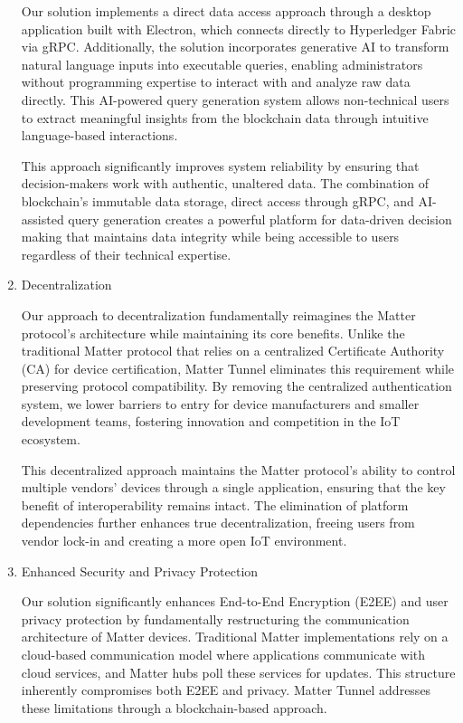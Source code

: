 \documentclass[conference]{IEEEtran}
\begin{document}
\begin{enumerate}[itemsep=2ex, parsep=1ex]
			Our solution implements a direct data access approach through a desktop application
			built with Electron, which connects directly to Hyperledger Fabric via
			gRPC. Additionally, the solution incorporates generative AI to transform
			natural language inputs into executable queries, enabling administrators without
			programming expertise to interact with and analyze raw data directly. This
			AI-powered query generation system allows non-technical users to extract
			meaningful insights from the blockchain data through intuitive language-based
			interactions.

			This approach significantly improves system reliability by ensuring that
			decision-makers work with authentic, unaltered data. The combination of
			blockchain's immutable data storage, direct access through gRPC, and AI-assisted
			query generation creates a powerful platform for data-driven decision
			making that maintains data integrity while being accessible to users
			regardless of their technical expertise.

		\item Decentralization

			Our approach to decentralization fundamentally reimagines the Matter
			protocol's architecture while maintaining its core benefits. Unlike the traditional
			Matter protocol that relies on a centralized Certificate Authority (CA) for
			device certification, Matter Tunnel eliminates this requirement while
			preserving protocol compatibility. By removing the centralized authentication
			system, we lower barriers to entry for device manufacturers and smaller
			development teams, fostering innovation and competition in the IoT ecosystem.

			This decentralized approach maintains the Matter protocol's ability to control
			multiple vendors' devices through a single application, ensuring that the key
			benefit of interoperability remains intact. The elimination of platform
			dependencies further enhances true decentralization, freeing users from vendor
			lock-in and creating a more open IoT environment.

		\item Enhanced Security and Privacy Protection

			Our solution significantly enhances End-to-End Encryption (E2EE) and user
			privacy protection by fundamentally restructuring the communication
			architecture of Matter devices. Traditional Matter implementations rely on
			a cloud-based communication model where applications communicate with cloud
			services, and Matter hubs poll these services for updates. This structure inherently
			compromises both E2EE and privacy. Matter Tunnel addresses these
			limitations through a blockchain-based approach.


\end{enumerate}
\end{document}
